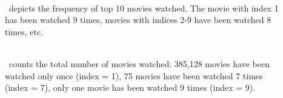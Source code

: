 \begin{description}

\item[]~\\\
depicts the frequency of top 10 movies watched. %
The movie with index 1 has been watched 9 times, movies with indices 2-9 have been watched 8 times, etc.


\item[]~\\\
counts the total number of movies watched: %
385,128 movies have been watched only once (index = 1), 75 movies have been watched 7 times (index = 7), only one movie has been watched 9 times (index = 9).

\end{description}
%
%
%
% 
%











